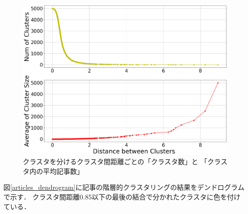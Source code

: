 \documentclass[12pt,a4j,dvipdfmx]{jreport}
\begin{document}
\begin{figure}[H]
	\centering
	\includegraphics[keepaspectratio, width=120mm]{img/process-06_articles-cluster_threshold-dependencies_reduced-data-to-5000_edit-label_Trim.png}
	\caption{クラスタを分けるクラスタ間距離ごとの「クラスタ数」と
  「クラスタ内の平均記事数」}
	\label{num_and_size_of_clusters_of_articles}
\end{figure}

\newpage

図\ref{articles_dendrogram}に記事の階層的クラスタリングの結果をデンドログラムで示す．
クラスタ間距離0.85以下の最後の結合で分かれたクラスタに色を付けている．
\end{document}
